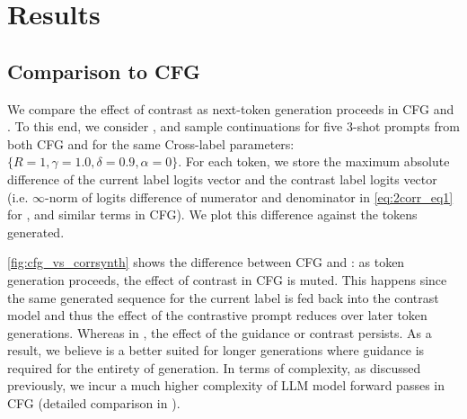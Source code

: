 

\section{Results}
\label{sec:expts}

\subsection{Comparison to CFG}
We compare the effect of contrast as next-token generation proceeds in CFG and \corrsyn{}. To this end, we consider \IMDb{}, and sample continuations for five 3-shot prompts from both CFG and \corrsyn{} for the same Cross-label parameters: \mbox{$\{R=1, \gamma=1.0, \delta=0.9, \alpha=0\}$}. For each token, we store the maximum absolute difference of the current label logits vector and the contrast label logits vector (i.e. $\infty$-norm of logits difference of numerator and denominator in \eqref{eq:2corr_eq1} for \corrsyn{}, and similar terms in CFG). We plot this difference against the tokens generated. 

\autoref{fig:cfg_vs_corrsynth} shows the difference between CFG and \corrsyn{}: as token generation proceeds, the effect of contrast in CFG is muted. This happens since the same generated sequence for the current label is fed back into the contrast model and thus the effect of the contrastive prompt reduces over later token generations. Whereas in \corrsyn{}, the effect of the guidance or contrast persists. As a result, we believe \corrsyn{} is a better suited for longer generations where guidance is required for the entirety of generation. In terms of complexity, as discussed previously, we incur a much higher complexity of LLM model forward passes in CFG (detailed comparison in ). 


